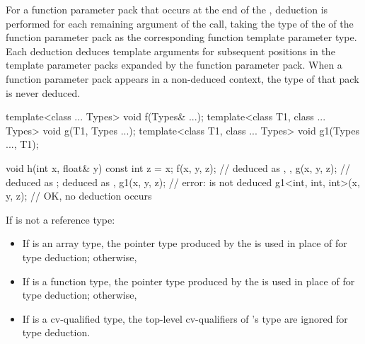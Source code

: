 For a function parameter pack that occurs at the end
of the ,
deduction is performed for each remaining argument of the call,
taking the type 
of the  of the function parameter pack
as the corresponding function template parameter type.
Each deduction deduces template arguments for subsequent positions in
the template parameter packs expanded by the function parameter pack.
When a function parameter pack appears in a non-deduced
context, the type of that pack is
never deduced.
\begin{example}
\begin{codeblock}
template<class ... Types> void f(Types& ...);
template<class T1, class ... Types> void g(T1, Types ...);
template<class T1, class ... Types> void g1(Types ..., T1);

void h(int x, float& y) {
  const int z = x;
  f(x, y, z);                   //  deduced as , , 
  g(x, y, z);                   //  deduced as ;  deduced as , 
  g1(x, y, z);                  // error:  is not deduced
  g1<int, int, int>(x, y, z);   // OK, no deduction occurs
}
\end{codeblock}
\end{example}

\pnum
If
is not a reference type:

\begin{itemize}
\item
If
is an array type, the pointer type produced by the  is used in place of
for type deduction;
otherwise,
\item
If
is a function type, the pointer type produced by the
 is used in place
of
for type
deduction; otherwise,
\item
If
is a cv-qualified type, the top-level cv-qualifiers of
's
type are ignored for type deduction.
\end{itemize}

